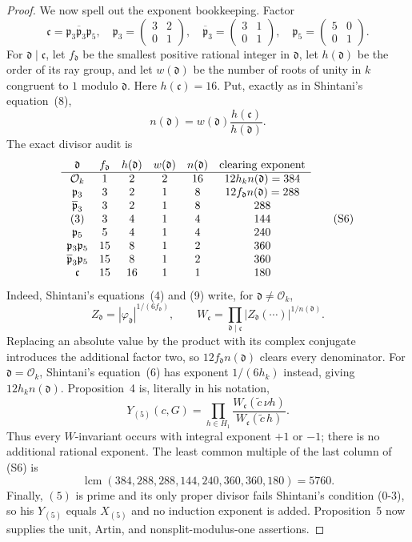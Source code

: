 \documentclass[11pt]{article}
\begin{document}
\begin{proof}
We now spell out the exponent bookkeeping.  Factor
\[
 \mathfrak c=\mathfrak p_3\overline{\mathfrak p}_3\mathfrak p_5,
\quad
 \mathfrak p_3=\begin{pmatrix}3&2\\0&1\end{pmatrix},\quad
 \overline{\mathfrak p}_3=\begin{pmatrix}3&1\\0&1\end{pmatrix},\quad
 \mathfrak p_5=\begin{pmatrix}5&0\\0&1\end{pmatrix}.
\]
For $\mathfrak d\mid\mathfrak c$, let $f_{\mathfrak d}$ be the
smallest positive rational integer in $\mathfrak d$, let
$h(\mathfrak d)$ be the order of its ray group, and let
$w(\mathfrak d)$ be the number of roots of unity in $k$ congruent to
$1$ modulo $\mathfrak d$.  Here $h(\mathfrak c)=16$.  Put, exactly as
in Shintani's equation~(8),
\[
 n(\mathfrak d)
 =w(\mathfrak d)\frac{h(\mathfrak c)}{h(\mathfrak d)}.
\tag{S5}
\]
The exact divisor audit is
\[
\begin{array}{c@{\quad}c@{\quad}c@{\quad}c@{\quad}c@{\quad}c}
\mathfrak d&f_{\mathfrak d}&h(\mathfrak d)&w(\mathfrak d)
 &n(\mathfrak d)&\text{clearing exponent}\\ \hline
\mathcal O_k&1&2&2&16&12h_kn(\mathfrak d)=384\\
\mathfrak p_3&3&2&1&8&12f_{\mathfrak d}n(\mathfrak d)=288\\
\overline{\mathfrak p}_3&3&2&1&8&288\\
(3)&3&4&1&4&144\\
\mathfrak p_5&5&4&1&4&240\\
\mathfrak p_3\mathfrak p_5&15&8&1&2&360\\
\overline{\mathfrak p}_3\mathfrak p_5&15&8&1&2&360\\
\mathfrak c&15&16&1&1&180
\end{array}
\tag{S6}
\]
Indeed, Shintani's equations~(4) and (9) write, for
$\mathfrak d\ne\mathcal O_k$,
\[
 Z_{\mathfrak d}=|\varphi_{\mathfrak d}|^{1/(6f_{\mathfrak d})},
 \qquad
 W_{\mathfrak c}
 =\prod_{\mathfrak d\mid\mathfrak c}
  |Z_{\mathfrak d}(\cdots)|^{1/n(\mathfrak d)}.
\]
Replacing an absolute value by the product with its complex conjugate
introduces the additional factor two, so
$12f_{\mathfrak d}n(\mathfrak d)$ clears every denominator.  For
$\mathfrak d=\mathcal O_k$, Shintani's equation~(6) has exponent
$1/(6h_k)$ instead, giving $12h_kn(\mathfrak d)$.  Proposition~4
is, literally in his notation,
\[
 Y_{(5)}(c,G)
 =\prod_{h\in H_1}
   \frac{W_{\mathfrak c}(\widetilde c\,\nu h)}
        {W_{\mathfrak c}(\widetilde c\,h)}.
\tag{S7}
\]
Thus every $W$-invariant occurs with integral exponent $+1$ or $-1$;
there is no additional rational exponent.  The least common multiple
of the last column of
(S6) is
\[
 \operatorname{lcm}(384,288,288,144,240,360,360,180)=5760.
\tag{S8}
\]
Finally, $(5)$ is prime and its only proper divisor fails Shintani's
condition (0-3), so his $Y_{(5)}$ equals $X_{(5)}$ and no induction
exponent is added.  Proposition~5 now supplies the unit, Artin, and
nonsplit-modulus-one assertions.
\end{proof}
\end{document}
